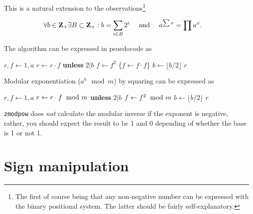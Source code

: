 \noindent
This is a natural extension to the
observations\footnote{The first of course being
that any non-negative number can be expressed
with the binary positional system. The latter
should be fairly self-explanatory.}

\vspace{-1em}
\[ \hspace*{-0.4cm}
    \forall b \in \textbf{Z}_{+} \exists B \subset \textbf{Z}_{+} : b = \sum_{i \in B} 2^i
    ~~~~ \textrm{and} ~~~~
    a^{\sum x} = \prod a^x.
\]

\noindent
The algorithm can be expressed in psuedocode as

\vspace{1em}
\hspace{-2.8ex}
\begin{minipage}{\linewidth}
\begin{algorithmic}
    \STATE $r, f \gets 1, a$
      \STATE $r \gets r \cdot f$ {\bf unless} $2 \vert b$
      \STATE $f \gets f^2$ \textcolor{c}{\{$f \gets f \cdot f$\}}
      \STATE $b \gets \lfloor b / 2 \rfloor$
    \ENDWHILE
    \RETURN $r$ 
\end{algorithmic}
\end{minipage}
\vspace{1em}

\noindent
Modular exponentiation ($a^b \mod m$) by squaring can be
expressed as

\vspace{1em}
\hspace{-2.8ex}
\begin{minipage}{\linewidth}
\begin{algorithmic}
    \STATE $r, f \gets 1, a$
      \STATE $r \gets r \cdot f \hspace*{-1ex}~ \mod m$ \textbf{unless} $2 \vert b$
      \STATE $f \gets f^2 \hspace*{-1ex}~ \mod m$
      \STATE $b \gets \lfloor b / 2 \rfloor$
    \ENDWHILE
    \RETURN $r$ 
\end{algorithmic}
\end{minipage}
\vspace{1em}

{\tt zmodpow} does \emph{not} calculate the
modular inverse if the exponent is negative,
rather, you should expect the result to be
1 and 0 depending of whether the base is 1
or not 1.


\newpage
\section{Sign manipulation}
\label{sec:Sign manipulation}

